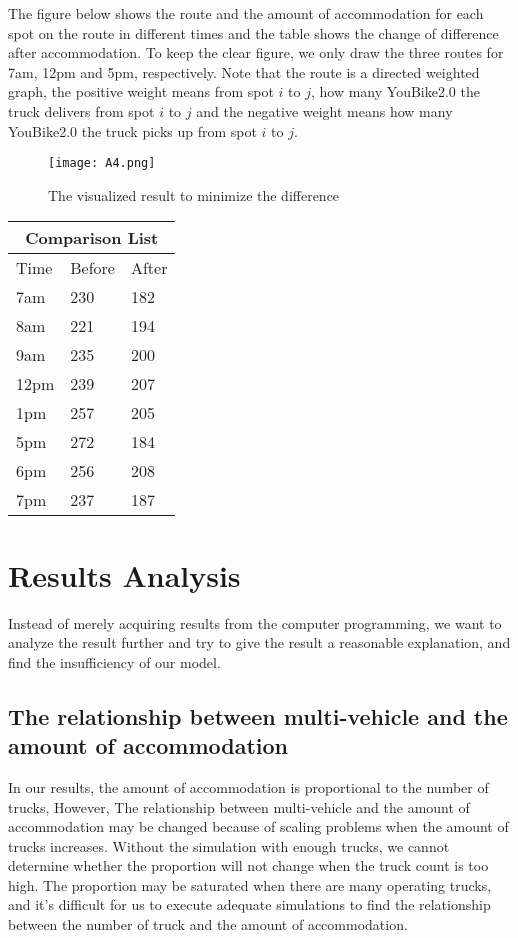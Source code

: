 \documentclass[12pt,a4paper]{article}
\begin{document}
The figure below shows the route and the amount of accommodation for each spot on the route in different times and the table shows the change of difference after accommodation. To keep the clear figure, we only draw the three routes for 7am, 12pm and 5pm, respectively. Note that the route is a directed weighted graph, the positive weight means from spot $i$ to $j$, how many YouBike2.0 the truck delivers from spot $i$ to $j$ and the negative weight means how many YouBike2.0 the truck picks up from spot $i$ to $j$.
\begin{figure}[htp]
    \centering
    \texttt{[image: A4.png]}
    \caption{The visualized result to minimize the difference}
    \label{fig:galaxy}
\end{figure}

\begin{center}
\begin{tabular}{ |p{1cm}|p{1.5cm}|p{1.5cm}|    }
\hline
\multicolumn{3}{|c|}{Comparison List} \\
\hline
Time& Before & After \\
\hline
7am & 230 & 182 \\
8am & 221 & 194 \\
9am & 235 & 200 \\
12pm & 239 & 207 \\
1pm & 257 & 205 \\
5pm & 272 & 184 \\
6pm & 256 & 208 \\
7pm & 237 & 187 \\
\hline
\end{tabular}
\end{center}

\section{Results Analysis}
Instead of merely acquiring results from the computer programming, we want to analyze the result further and try to give the result a reasonable explanation, and find the insufficiency of our model.
\subsection{The relationship between multi-vehicle and the amount of accommodation}
In our results, the amount of accommodation is proportional to the number of trucks, However, The relationship between multi-vehicle and the amount of accommodation may be changed because of scaling problems when the amount of trucks increases. Without the simulation with enough trucks, we cannot determine whether the proportion will not change when the truck count is too high. The proportion may be saturated when there are many operating trucks, and it's difficult for us to execute adequate simulations to find the relationship between the number of truck and the amount of accommodation.
\end{document}

